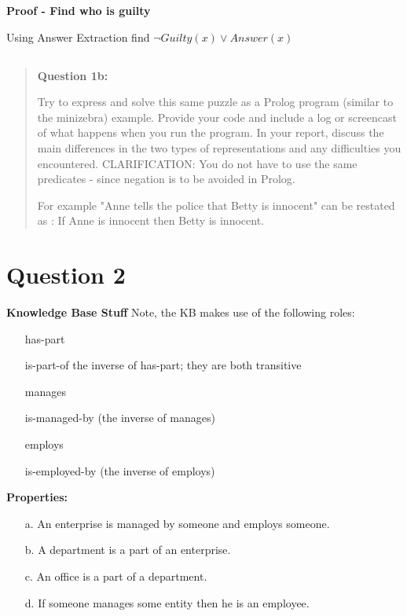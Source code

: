 \documentclass[11pt]{article}
\begin{document}
\textbf{Proof - Find who is guilty}

Using Answer Extraction find $\lnot Guilty(x) \lor Answer(x)$



\subsection{}
\begin{quote}
    \textbf{Question 1b:}

Try to express and solve this same puzzle as a Prolog program (similar to the minizebra) example. Provide your code and include a log or screencast of what happens when you run the program. In your report, discuss the main differences in the two types of representations and any difficulties you encountered.
CLARIFICATION: You do not have to use the same predicates - since negation is to be avoided in Prolog.

For example  "Anne tells the police that Betty is innocent"  can be restated as : If Anne is innocent then Betty is innocent.
\end{quote}

\section{Question 2}
\textbf{Knowledge Base Stuff} 
Note, the KB makes use of the following roles:

\begin{itemize}
    \item[] has-part
    \item[] is-part-of the inverse of has-part; they are both transitive
    \item[] manages
    \item[] is-managed-by (the inverse of manages)
    \item[] employs
    \item[] is-employed-by (the inverse of employs)
\end{itemize}

\noindent\textbf{Properties:}
\begin{itemize}
    \item[a.] An enterprise is managed by someone and employs someone.
    \item[b.] A department is a part of an enterprise.
    \item[c.] An office is a part of a department.
    \item[d.] If someone manages some entity then he is an employee.
\end{itemize} 
\end{document}
